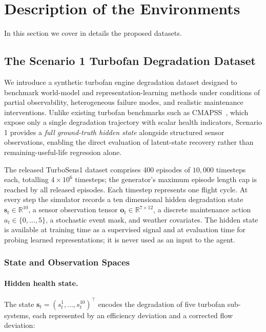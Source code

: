 \section{Description of the Environments}

In this section we cover in details the proposed datasets.

\subsection{The Scenario 1 Turbofan Degradation Dataset}
\label{sec:dataset_scenario3}

We introduce a synthetic turbofan engine degradation dataset designed to
benchmark world-model and representation-learning methods under conditions
of partial observability, heterogeneous failure modes, and realistic
maintenance interventions. Unlike existing turbofan benchmarks such as
CMAPSS~\cite{Saxena_Goebel_Simon_Eklund_2008}, which expose only a single degradation
trajectory with scalar health indicators, Scenario 1 provides a
\emph{full ground-truth hidden state} alongside structured sensor
observations, enabling the direct evaluation of latent-state recovery
rather than remaining-useful-life regression alone.

The released TurboSens1 dataset comprises 400 episodes of $10{,}000$
timesteps each, totalling $4 \times 10^6$ timesteps; the generator's
maximum episode length cap is reached by all released episodes.
Each timestep represents one flight cycle. At every step the simulator
records a ten dimensional hidden degradation state
$\mathbf{s}_t \in \mathbb{R}^{10}$, a sensor observation tensor
$\mathbf{o}_t \in \mathbb{R}^{7 \times 12}$, a discrete maintenance
action $a_t \in \{0, \ldots, 5\}$, a stochastic event mask, and weather
covariates. The hidden state is available at training time as a
supervised signal and at evaluation time for probing learned
representations; it is never used as an input to the agent.

\subsubsection{State and Observation Spaces}
\label{sec:dataset_spaces}

\paragraph{Hidden health state.}
The state $\mathbf{s}_t = (s_t^1, \ldots, s_t^{10})^{\!\top}$ encodes
the degradation of five turbofan sub-systems, each represented by an
efficiency deviation and a corrected flow deviation:


